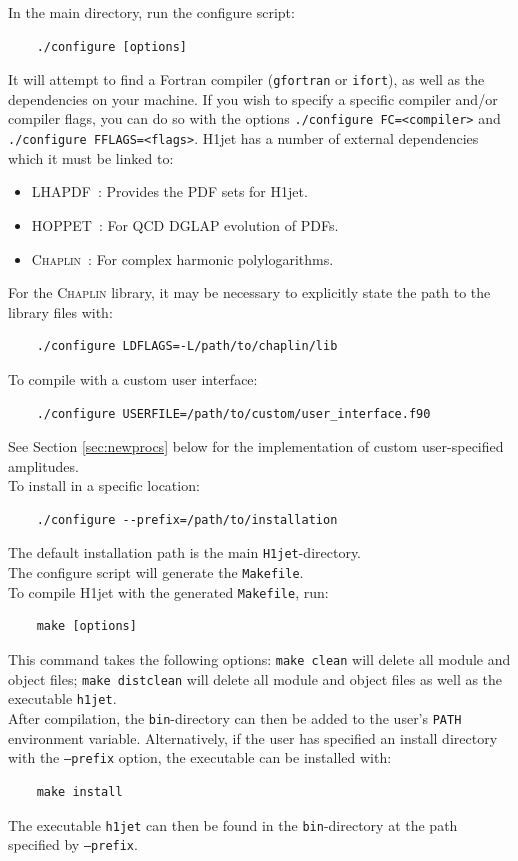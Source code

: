 \documentclass[12pt,a4wide]{article}
\begin{document}
In the main directory, run the configure script: 
\begin{lstlisting}
	./configure [options] 
\end{lstlisting}
It will attempt to find a Fortran compiler (\texttt{gfortran} or \texttt{ifort}), as well as the dependencies on your machine. If you wish to specify a specific compiler and/or compiler flags, you can do so with the options \texttt{./configure FC=<compiler>} and \texttt{./configure FFLAGS=<flags>}. H1jet has a number of external dependencies which it must be linked to: 
\begin{itemize}
	\item LHAPDF~\cite{Buckley:2014ana}: Provides the PDF sets for H1jet. 
	\item \textsc{HOPPET}~\cite{Salam:2008qg}: For QCD DGLAP evolution of PDFs. 
	\item \textsc{Chaplin}~\cite{Buehler:2011ev}: For complex harmonic polylogarithms. 
\end{itemize} 
For the \textsc{Chaplin} library, it may be necessary to explicitly state the path to the library files with:
\begin{lstlisting}
	./configure LDFLAGS=-L/path/to/chaplin/lib 
\end{lstlisting}
To compile with a custom user interface: 
\begin{lstlisting}
	./configure USERFILE=/path/to/custom/user_interface.f90  
\end{lstlisting}
See Section \ref{sec:newprocs} below for the implementation of custom user-specified amplitudes. \\ 
To install in a specific location: 
\begin{lstlisting}
	./configure --prefix=/path/to/installation 
\end{lstlisting}
The default installation path is the main \texttt{H1jet}-directory. \\ 
The configure script will generate the \texttt{Makefile}. \\ 
To compile H1jet with the generated \texttt{Makefile}, run: 
\begin{lstlisting}
	make [options] 
\end{lstlisting}
This command takes the following options: \texttt{make clean} will delete all module and object files; \texttt{make distclean} will delete all module and object files as well as the executable \texttt{h1jet}. \\ 

After compilation, the \texttt{bin}-directory can then be added to the user's \texttt{PATH} environment variable. Alternatively, if the user has specified an install directory with the \texttt{--prefix} option, the executable can be installed with: 
\begin{lstlisting}
	make install  
\end{lstlisting}
The executable \texttt{h1jet} can then be found in the \texttt{bin}-directory at the path specified by \texttt{--prefix}. 
\end{document}
